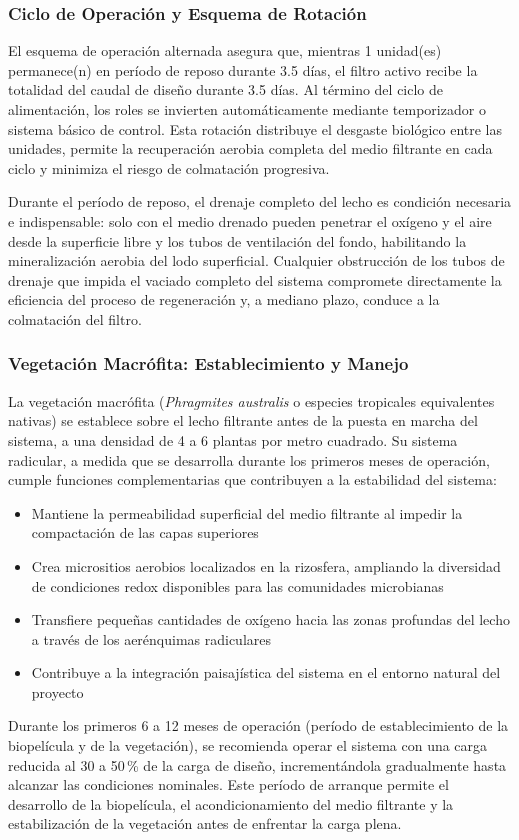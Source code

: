 \documentclass[12pt,a4paper]{article}
\begin{document}
\subsubsection*{Ciclo de Operación y Esquema de Rotación}

El esquema de operación alternada asegura que, mientras 1 unidad(es) permanece(n) en período de reposo durante 3.5 días, el filtro activo recibe la totalidad del caudal de diseño durante 3.5 días. Al término del ciclo de alimentación, los roles se invierten automáticamente mediante temporizador o sistema básico de control. Esta rotación distribuye el desgaste biológico entre las unidades, permite la recuperación aerobia completa del medio filtrante en cada ciclo y minimiza el riesgo de colmatación progresiva.

Durante el período de reposo, el drenaje completo del lecho es condición necesaria e indispensable: solo con el medio drenado pueden penetrar el oxígeno y el aire desde la superficie libre y los tubos de ventilación del fondo, habilitando la mineralización aerobia del lodo superficial. Cualquier obstrucción de los tubos de drenaje que impida el vaciado completo del sistema compromete directamente la eficiencia del proceso de regeneración y, a mediano plazo, conduce a la colmatación del filtro.

\subsubsection*{Vegetación Macrófita: Establecimiento y Manejo}

La vegetación macrófita (\textit{Phragmites australis} o especies tropicales equivalentes nativas) se establece sobre el lecho filtrante antes de la puesta en marcha del sistema, a una densidad de 4 a 6 plantas por metro cuadrado. Su sistema radicular, a medida que se desarrolla durante los primeros meses de operación, cumple funciones complementarias que contribuyen a la estabilidad del sistema:

\begin{itemize}[noitemsep,leftmargin=2em]
    \item Mantiene la permeabilidad superficial del medio filtrante al impedir la compactación de las capas superiores
    \item Crea micrositios aerobios localizados en la rizosfera, ampliando la diversidad de condiciones redox disponibles para las comunidades microbianas
    \item Transfiere pequeñas cantidades de oxígeno hacia las zonas profundas del lecho a través de los aerénquimas radiculares
    \item Contribuye a la integración paisajística del sistema en el entorno natural del proyecto
\end{itemize}

Durante los primeros 6 a 12 meses de operación (período de establecimiento de la biopelícula y de la vegetación), se recomienda operar el sistema con una carga reducida al 30 a 50\,\% de la carga de diseño, incrementándola gradualmente hasta alcanzar las condiciones nominales. Este período de arranque permite el desarrollo de la biopelícula, el acondicionamiento del medio filtrante y la estabilización de la vegetación antes de enfrentar la carga plena.
\end{document}
